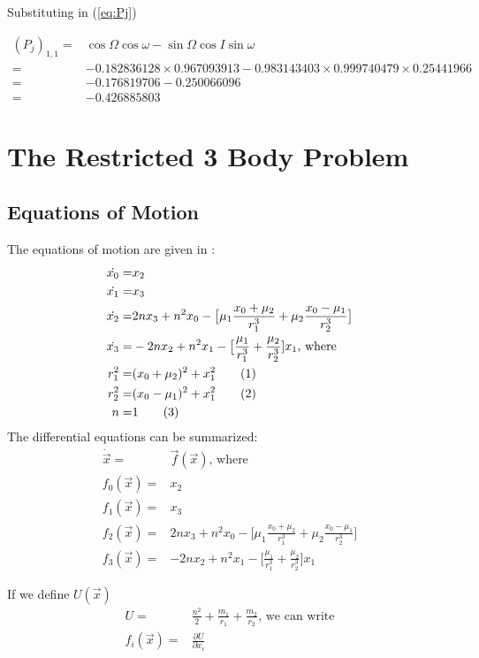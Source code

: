 \documentclass[]{article}
\newcommand\numberthis{\addtocounter{equation}{1}\tag{\theequation}}
\begin{document}
Substituting in (\ref{eq:Pj})

\begin{align*}
(P_j)_{1,1} =& \cos \Omega \cos \omega - \sin \Omega \cos I \sin \omega \\
=& -0.182836128 \times 	0.967093913 - 0.983143403 \times 0.999740479 \times 	0.25441966\\
=& -0.176819706 - 0.250066096\\
=& -0.426885803
\end{align*}

\section{The Restricted 3 Body Problem}

\subsection{Equations of Motion}

The equations of motion are given in \cite[(3.16-17)]{ssd}:
\begin{align*}
	\dot{x_0} =& x_2\\
	\dot{x_1} =& x_3\\
	\dot{x_2} =& 2nx_3 + n^2x_0-\big[\mu_1\frac{x_0+\mu_2}{r_1^3} + \mu_2\frac{x_0-\mu_1}{r_2^3}\big]\\
	\dot{x_3} =& -2nx_2 + n^2x_1 - \big[\frac{\mu_1}{r_1^3} + \frac{\mu_2}{r_2^3}]x_1\text{, where}\\
	r_1^2 =& (x_0+\mu_2)^2 + x_1^2 \numberthis \label{eq:def:r1}\\
	r_2^2 =& (x_0-\mu_1)^2 + x_1^2  \numberthis \label{eq:def:r2}\\
	n =& 1 \numberthis \label{eq:def:n}\\
\end{align*}
The differential equations can be summarized:
\begin{align*}
	\dot{\vec{x}} =& \vec{f}(\vec{x}) \text{, where}\\
	f_0(\vec{x}) =& x_2\\
	f_1(\vec{x}) =& x_3\\
	f_2(\vec{x}) =& 2nx_3 + n^2x_0-\big[\mu_1\frac{x_0+\mu_2}{r_1^3} + \mu_2\frac{x_0-\mu_1}{r_2^3}\big]\\
	f_3(\vec{x}) =& -2nx_2 + n^2x_1 - \big[\frac{\mu_1}{r_1^3} + \frac{\mu_2}{r_2^3}]x_1
\end{align*}

If we define $U(\vec{x})$
\begin{align*}
	U =& \frac{n^2}{2} + \frac{m_1}{r_1} + \frac{m_2}{r_2} \text{, we can write}\\
	f_i(\vec{x}) =& \frac{\partial U}{\partial x_i}
\end{align*}
\end{document}
